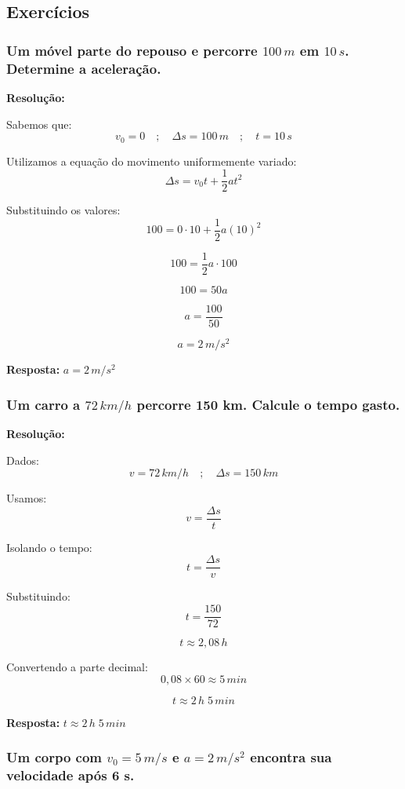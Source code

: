 \documentclass[a4paper,12pt]{article}
\begin{document}
\subsection{Exercícios}
\subsubsection{Um móvel parte do repouso e percorre $100\,m$ em $10\,s$. Determine a aceleração.}
{\color{blue}
\textbf{Resolução:}

Sabemos que:
\[
v_0 = 0 \quad ; \quad \Delta s = 100\,m \quad ; \quad t = 10\,s
\]

Utilizamos a equação do movimento uniformemente variado:
\[
\Delta s = v_0 t + \frac{1}{2} a t^2
\]

Substituindo os valores:
\[
100 = 0 \cdot 10 + \frac{1}{2} a (10)^2
\]

\[
100 = \frac{1}{2} a \cdot 100
\]

\[
100 = 50a
\]

\[
a = \frac{100}{50}
\]

\[
a = 2\,m/s^2
\]

\textbf{Resposta:} $a = 2\,m/s^2$
}

\newpage

\subsubsection{Um carro a $72\,km/h$ percorre 150 km. Calcule o tempo gasto.}

{\color{blue}
\textbf{Resolução:}

Dados:
\[
v = 72\,km/h \quad ; \quad \Delta s = 150\,km
\]

Usamos:
\[
v = \frac{\Delta s}{t}
\]

Isolando o tempo:
\[
t = \frac{\Delta s}{v}
\]

Substituindo:
\[
t = \frac{150}{72}
\]

\[
t \approx 2{,}08\,h
\]

Convertendo a parte decimal:
\[
0{,}08 \times 60 \approx 5\,min
\]

\[
t \approx 2\,h \; 5\,min
\]

\textbf{Resposta:} $t \approx 2\,h \; 5\,min$

}

\newpage

\subsubsection{Um corpo com $v_0 = 5\,m/s$ e $a = 2\,m/s^2$ encontra sua velocidade após 6 s.}
\end{document}
